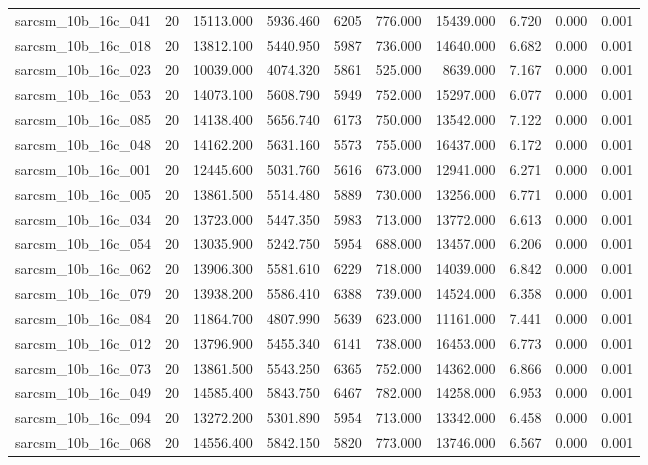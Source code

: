 \begin{tabular}{lrrrrrrrrr}
sarcsm\_10b\_16c\_041 & 20 & 15113.000 & 5936.460 & 6205 & 776.000 & 15439.000 & 6.720 & 0.000 & 0.001 \\
sarcsm\_10b\_16c\_018 & 20 & 13812.100 & 5440.950 & 5987 & 736.000 & 14640.000 & 6.682 & 0.000 & 0.001 \\
sarcsm\_10b\_16c\_023 & 20 & 10039.000 & 4074.320 & 5861 & 525.000 & 8639.000 & 7.167 & 0.000 & 0.001 \\
sarcsm\_10b\_16c\_053 & 20 & 14073.100 & 5608.790 & 5949 & 752.000 & 15297.000 & 6.077 & 0.000 & 0.001 \\
sarcsm\_10b\_16c\_085 & 20 & 14138.400 & 5656.740 & 6173 & 750.000 & 13542.000 & 7.122 & 0.000 & 0.001 \\
sarcsm\_10b\_16c\_048 & 20 & 14162.200 & 5631.160 & 5573 & 755.000 & 16437.000 & 6.172 & 0.000 & 0.001 \\
sarcsm\_10b\_16c\_001 & 20 & 12445.600 & 5031.760 & 5616 & 673.000 & 12941.000 & 6.271 & 0.000 & 0.001 \\
sarcsm\_10b\_16c\_005 & 20 & 13861.500 & 5514.480 & 5889 & 730.000 & 13256.000 & 6.771 & 0.000 & 0.001 \\
sarcsm\_10b\_16c\_034 & 20 & 13723.000 & 5447.350 & 5983 & 713.000 & 13772.000 & 6.613 & 0.000 & 0.001 \\
sarcsm\_10b\_16c\_054 & 20 & 13035.900 & 5242.750 & 5954 & 688.000 & 13457.000 & 6.206 & 0.000 & 0.001 \\
sarcsm\_10b\_16c\_062 & 20 & 13906.300 & 5581.610 & 6229 & 718.000 & 14039.000 & 6.842 & 0.000 & 0.001 \\
sarcsm\_10b\_16c\_079 & 20 & 13938.200 & 5586.410 & 6388 & 739.000 & 14524.000 & 6.358 & 0.000 & 0.001 \\
sarcsm\_10b\_16c\_084 & 20 & 11864.700 & 4807.990 & 5639 & 623.000 & 11161.000 & 7.441 & 0.000 & 0.001 \\
sarcsm\_10b\_16c\_012 & 20 & 13796.900 & 5455.340 & 6141 & 738.000 & 16453.000 & 6.773 & 0.000 & 0.001 \\
sarcsm\_10b\_16c\_073 & 20 & 13861.500 & 5543.250 & 6365 & 752.000 & 14362.000 & 6.866 & 0.000 & 0.001 \\
sarcsm\_10b\_16c\_049 & 20 & 14585.400 & 5843.750 & 6467 & 782.000 & 14258.000 & 6.953 & 0.000 & 0.001 \\
sarcsm\_10b\_16c\_094 & 20 & 13272.200 & 5301.890 & 5954 & 713.000 & 13342.000 & 6.458 & 0.000 & 0.001 \\
sarcsm\_10b\_16c\_068 & 20 & 14556.400 & 5842.150 & 5820 & 773.000 & 13746.000 & 6.567 & 0.000 & 0.001 \\

\end{tabular}
